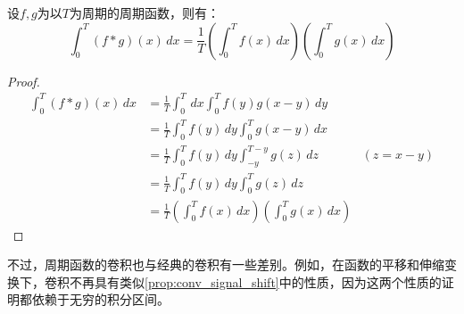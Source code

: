 \begin{proposition}[“面积”关系]
    设$f,g$为以$T$为周期的周期函数，则有：
    \[\int_0^{T}(f*g)(x)\,dx=\frac{1}{T}\left(\int_0^{T}f(x)\,dx\right)\left(\int_0^{T}g(x)\,dx\right)\]
\end{proposition}
\begin{proof}
    \begin{align*}
        \int_0^{T}(f*g)(x)\,dx&=\frac{1}{T}\int_0^{T}\,dx\int_0^{T}f(y)g(x-y)\,dy\\
        &=\frac{1}{T}\int_0^{T}f(y)\,dy\int_0^{T}g(x-y)\,dx\\
        &=\frac{1}{T}\int_0^{T}f(y)\,dy\int_{-y}^{T-y}g(z)\,dz&(z=x-y)\\
        &=\frac{1}{T}\int_0^{T}f(y)\,dy\int_0^{T}g(z)\,dz\\
        &=\frac{1}{T}\left(\int_0^{T}f(x)\,dx\right)\left(\int_0^{T}g(x)\,dx\right)
    \end{align*}
\end{proof}

不过，周期函数的卷积也与经典的卷积有一些差别。例如，在函数的平移和伸缩变换下，卷积不再具有类似\cref{prop:conv_signal_shift}中的性质，因为这两个性质的证明都依赖于无穷的积分区间。

